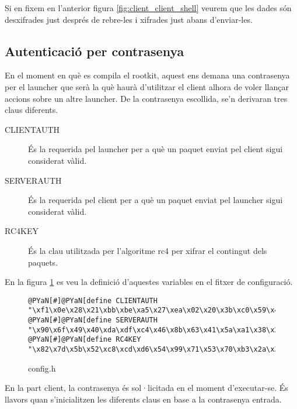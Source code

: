 Si en fixem en l'anterior figura \ref{fig:client_client_shell} veurem que les dades són desxifrades just després de rebre-les
i xifrades just abans d'enviar-les.

\subsection{Autenticació per contrasenya}

En el moment en què es compila el rootkit, aquest ens demana una contrasenya per el launcher que serà la 
què haurà d'utilitzar el client alhora de voler llançar accions sobre un altre launcher. De la 
contrasenya escollida, se'n derivaran tres claus diferents. 

\begin{description}
    \item[CLIENTAUTH] És la requerida pel launcher per a què un paquet enviat pel client sigui considerat 
        vàlid.
    \item[SERVERAUTH] És la requerida pel client per a què un paquet enviat pel launcher sigui considerat
        vàlid.
    \item[RC4KEY] És la clau utilitzada per l'algoritme rc4 per xifrar el contingut dels paquets.
\end{description}

En la figura \ref{fig:config} es veu la definició d'aquestes variables en el fitxer de configuració.

\begin{figure}[htp]
\begin{Verbatim}[commandchars=@\[\]]
@PYaN[#]@PYaN[define CLIENTAUTH "\xf1\x0e\x28\x21\xbb\xbe\xa5\x27\xea\x02\x20\x3b\xc0\x59\x44\x51\x90"]
@PYaN[#]@PYaN[define SERVERAUTH "\x90\x6f\x49\x40\xda\xdf\xc4\x46\x8b\x63\x41\x5a\xa1\x38\x25\x30\xf1"]
@PYaN[#]@PYaN[define RC4KEY "\x82\x7d\x5b\x52\xc8\xcd\xd6\x54\x99\x71\x53\x70\xb3\x2a\x37\x22\xe3"]
\end{Verbatim}
    \caption{config.h}
    \label{fig:config}
\end{figure}

En la part client, la contrasenya és sol·licitada en el moment d'executar-se. És llavors quan s'inicialitzen les 
diferents claus en base a la contrasenya entrada.

